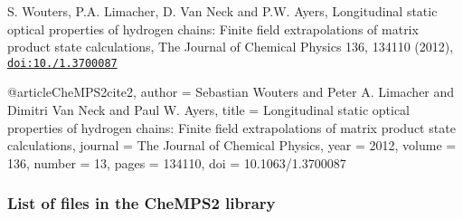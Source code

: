 \begin{DoxyEnumerate}
\item S. Wouters, P.\-A. Limacher, D. Van Neck and P.\-W. Ayers, Longitudinal static optical properties of hydrogen chains\-: Finite field extrapolations of matrix product state calculations, The Journal of Chemical Physics 136, 134110 (2012), \href{http://dx.doi.org/10.1063/1.3700087}{\tt doi\-:10./1.3700087} \begin{DoxyVerb} @article{CheMPS2cite2,
     author = {Sebastian Wouters and Peter A. Limacher and Dimitri {Van Neck} and Paul W. Ayers},
     title = {Longitudinal static optical properties of hydrogen chains: Finite field extrapolations of matrix product state calculations},
     journal = {The Journal of Chemical Physics},
     year = {2012},
     volume = {136},
     number = {13}, 
     pages = {134110},
     doi = {10.1063/1.3700087} 
 }
\end{DoxyVerb}

\end{DoxyEnumerate}

\subsubsection*{List of files in the Che\-M\-P\-S2 library}

